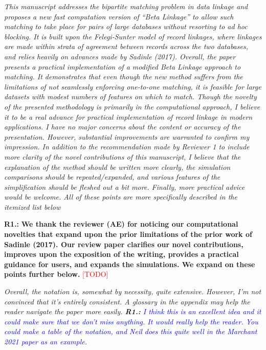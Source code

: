 \documentclass[letterpaper, parskip]{scrartcl}
\newcommand{\pointRaised}[1]{%
	\begin{tcolorbox}
		\itshape #1
	\end{tcolorbox}
}
\newcounter{responsectr}[section]     %
\newcommand{\reply}[2]{%
	\refstepcounter{responsectr}%
	\textbf{#1.\theresponsectr:} #2
}
\newcommand{\todo}{\textcolor{red}{[TODO]}\xspace}
\begin{document}
	
	\pointRaised{%
	This manuscript addresses the bipartite matching problem in data linkage and proposes a new fast
	computation version of “Beta Linkage” to allow such matching to take place for pairs of large databases
	without resorting to ad hoc blocking. It is built upon the Felegi-Sunter model of record linkages, where
	linkages are made within strata of agreement between records across the two databases, and relies
	heavily on advances made by Sadinle (2017).
	Overall, the paper presents a practical implementation of a modified Beta Linkage approach to
	matching. It demonstrates that even though the new method suffers from the limitations of not
	seamlessly enforcing one-to-one matching, it is feasible for large datasets with modest numbers of
	features on which to match. Though the novelty of the presented methodology is primarily in the
	computational approach, I believe it to be a real advance for practical implementation of record linkage
	in modern applications.
	I have no major concerns about the content or accuracy of the presentation. However, substantial
	improvements are warranted to confirm my impression. In addition to the recommendation made by
	Reviewer 1 to include more clarity of the novel contributions of this manuscript, I believe that the
	explanation of the method should be written more clearly, the simulation comparisons should be
	repeated/expanded, and various features of the simplification should be fleshed out a bit more. Finally,
	more practical advice would be welcome. All of these points are more specifically described in the
	itemized list below
	}
	
	\reply{R1}{%
	\textbf{We thank the reviewer (AE) for noticing our computational novelties that expand upon the prior limitations of the prior work of Sadinle (2017). 
	Our review paper clarifies our novel contributions, improves upon the exposition of the writing, provides a practical guidance for users, and expands the simulations. We expand on these points further below.} \todo
	}
	
	
		\pointRaised{%
Overall, the notation is, somewhat by necessity, quite extensive. However, I’m not convinced that it’s entirely consistent. A glossary in the appendix may help the reader navigate the paper more easily.
            \reply{R1}{%
            \textcolor{blue}{I think this is an excellent idea and it could make sure that we don't miss anything. It would really help the reader. You could make a table of the notation, and Neil does this quite well in the Marchant 2021 paper as an example.}
            }


	}
\end{document}
